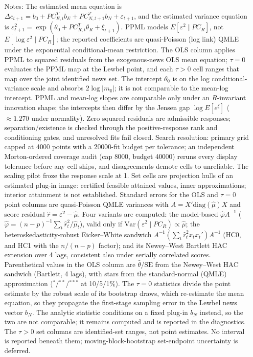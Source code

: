\documentclass[11pt]{article}
\begin{document}
\begin{table}[!htbp]
\begin{threeparttable}
\begin{tablenotes}[flushleft]
\item Notes: The estimated mean equation is $\Delta c_{t+1}=b_{0}+PC_{E,t}^{T}b_{E}+ PC_{N,t+1}^{T}b_{N}+\varepsilon_{t+1}$, and the estimated variance equation is $\varepsilon_{t+1}^{2}= \exp(\theta_{0}+PC_{R,t}^{T}\theta_{R}+\xi_{t+1})$. PPML models $E[\varepsilon^2 \mid PC_R]$, not $E[\log \varepsilon^2 \mid PC_R]$; the reported coefficients are quasi-Poisson (log link) QMLE under the exponential conditional-mean restriction. The OLS column applies PPML to squared residuals from the exogenous-news OLS mean equation; $\tau{=}0$ evaluates the PPML map at the Lewbel point, and each $\tau{>}0$ cell ranges that map over the joint identified news set. The intercept $\theta_0$ is on the log conditional-variance scale and absorbs $2\log|m_0|$; it is not comparable to the mean-log intercept. PPML and mean-log slopes are comparable only under an $R$-invariant innovation shape; the intercepts then differ by the Jensen gap $\log E[e^{\xi}]$ ($\approx 1.270$ under normality). Zero squared residuals are admissible responses; separation/existence is checked through the positive-response rank and conditioning gates, and unresolved fits fail closed. Search resolution: primary grid capped at 4000 points with a 20000-fit budget per tolerance; an independent Morton-ordered coverage audit (cap 8000, budget 40000) reruns every display tolerance before any cell ships, and disagreements demote cells to unreliable. The scaling pilot froze the response scale at 1. Set cells are projection hulls of an estimated plug-in image: certified feasible attained values, inner approximations; interior attainment is not established. Standard errors for the OLS and $\tau{=}0$ point columns are quasi-Poisson QMLE variances with $A = X'\mathrm{diag}(\hat\mu)X$ and score residual $\hat r = \varepsilon^2 - \hat\mu$. Four variants are computed: the model-based $\hat\varphi A^{-1}$ ($\hat\varphi = (n{-}p)^{-1}\sum_t \hat r_t^2/\hat\mu_t$), valid only if $\mathrm{Var}(\varepsilon^2 \mid PC_R) \propto \hat\mu$; the heteroskedasticity-robust Eicker--White sandwich $A^{-1}(\sum_t \hat r_t^2 x_t x_t')A^{-1}$ (HC0, and HC1 with the $n/(n{-}p)$ factor); and its Newey--West Bartlett HAC extension over 4 lags, consistent also under serially correlated scores. Parenthetical values in the OLS column are $\hat\theta/\mathrm{SE}$ from the Newey--West HAC sandwich (Bartlett, 4 lags), with stars from the standard-normal (QMLE) approximation ($^{*}$/$^{**}$/$^{***}$ at 10/5/1\%). The $\tau{=}0$ statistics divide the point estimate by the robust scale of its bootstrap draws, which re-estimate the mean equation, so they propagate the first-stage sampling error in the Lewbel news vector $b_N$. The analytic statistic conditions on a fixed plug-in $b_N$ instead, so the two are not comparable; it remains computed and is reported in the diagnostics. The $\tau{>}0$ set columns are identified-set ranges, not point estimates. No interval is reported beneath them; moving-block-bootstrap set-endpoint uncertainty is deferred.
\end{tablenotes}
\end{threeparttable}
\end{table}
\end{document}
